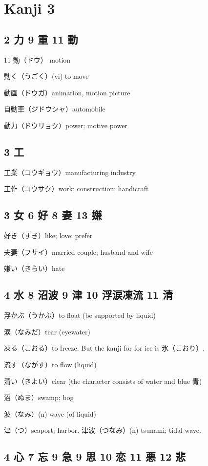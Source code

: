 \chapter{Kanji 3}

\section{2 力 9 重 11 動}

11 動（ドウ） motion

動く（うごく）(vi) to move

動画（ドウガ）animation, motion picture

自動車（ジドウシャ）automobile

動力（ドウリョク）power; motive power

\section{3 工}

工業（コウギョウ）manufacturing industry

工作（コウサク）work; construction; handicraft

\section{3 女 6 好 8 妻 13 嫌}

好き（すき）like; love; prefer

夫妻（フサイ）married couple; husband and wife

嫌い（きらい）hate

\section{4 水 8 沼波 9 津 10 浮涙凍流 11 清}

浮かぶ（うかぶ）to float (be supported by liquid)

涙（なみだ）tear (eyewater)

凍る（こおる）to freeze.
But the kanji for for ice is 氷（こおり）.

流す（ながす）to flow (liquid)

清い（きよい）clear (the character consists of water and blue 青)

沼（ぬま）swamp; bog

波（なみ）(n) wave (of liquid)

津（つ）seaport; harbor.
津波（つなみ）(n) tsunami; tidal wave.

\section{4 心 7 忘 9 急 9 思 10 恋 11 悪 12 悲}

